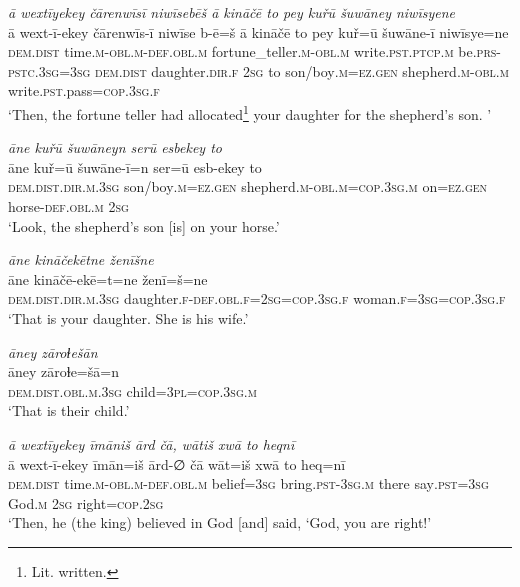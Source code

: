 \ea \label{KŠ.99}
\textit{ā wextīyekey čārenwīsī niwīsebēš ā kināčē to pey kuřū šuwāney niwīsyene} \\ 
\gll ā wext-ī-ekey čārenwīs-ī niwīse b-ē=š ā kināčē to pey kuř=ū šuwāne-ī niwīsye=ne \\ 
 \textsc{dem.dist} time\textsc{.m}\textsc{-obl}\textsc{.m}\textsc{-def}\textsc{.obl}\textsc{.m} fortune\_teller\textsc{.m}\textsc{-obl}\textsc{.m} write\textsc{.pst}\textsc{.ptcp}\textsc{.m} be\textsc{.prs}\textsc{-pstc}\textsc{.3sg}\textsc{=3sg} \textsc{dem.dist} daughter\textsc{.dir}\textsc{.f} \textsc{2sg} to son/boy\textsc{.m}\textsc{\textsc{=ez.gen}} shepherd\textsc{.m}\textsc{-obl}\textsc{.m} write\textsc{.pst}.pass\textsc{=cop}\textsc{.3sg}\textsc{.f} \\ 
\glt `Then, the fortune teller had allocated\footnote{Lit. written.} your daughter for the shepherd’s son. '
\z 
 
\ea \label{KŠ.100}
\textit{āne kuřū šuwāneyn serū esbekey to} \\ 
\gll āne kuř=ū šuwāne-ī=n ser=ū esb-ekey to \\ 
 \textsc{dem.dist}\textsc{.dir}\textsc{.m}\textsc{.3sg} son/boy\textsc{.m}\textsc{\textsc{=ez.gen}} shepherd\textsc{.m}\textsc{-obl}\textsc{.m}\textsc{=cop}\textsc{.3sg}\textsc{.m} on\textsc{\textsc{=ez.gen}} horse\textsc{-def}\textsc{.obl}\textsc{.m} \textsc{2sg} \\ 
\glt `Look, the shepherd’s son [is] on your horse.'
\z 
 
\ea \label{KŠ.101}
\textit{āne kināčekētne ženīšne} \\ 
\gll āne kināčē-ekē=t=ne ženī=š=ne \\ 
 \textsc{dem.dist}\textsc{.dir}\textsc{.m}\textsc{.3sg} daughter\textsc{.f}\textsc{-def}\textsc{.obl}\textsc{.f}\textsc{=\textsc{2sg}}\textsc{=cop}\textsc{.3sg}\textsc{.f} woman\textsc{.f}\textsc{=3sg}\textsc{=cop}\textsc{.3sg}\textsc{.f} \\ 
\glt `That is your daughter. She is his wife.'
\z 
 
\ea \label{KŠ.102}
\textit{āney zāroɫešān} \\ 
\gll āney zāroɫe=šā=n \\ 
 \textsc{dem.dist}\textsc{.obl}\textsc{.m}\textsc{.3sg} child\textsc{=3pl}\textsc{=cop}\textsc{.3sg}\textsc{.m} \\ 
\glt `That is their child.'
\z 
 
\ea \label{KŠ.104}
\textit{ā wextīyekey īmāniš ārd čā, wātiš xwā to heqnī} \\ 
\gll ā wext-ī-ekey īmān=iš ārd-∅ čā wāt=iš xwā to heq=nī \\ 
 \textsc{dem.dist} time\textsc{.m}\textsc{-obl}\textsc{.m}\textsc{-def}\textsc{.obl}\textsc{.m} belief\textsc{=3sg} bring\textsc{.pst}\textsc{-3sg}\textsc{.m} there say\textsc{.pst}\textsc{=3sg} God\textsc{.m} \textsc{2sg} right\textsc{=cop}\textsc{.\textsc{2sg}} \\ 
\glt `Then, he (the king) believed in God [and] said, ‘God, you are right!'
\z 
 
